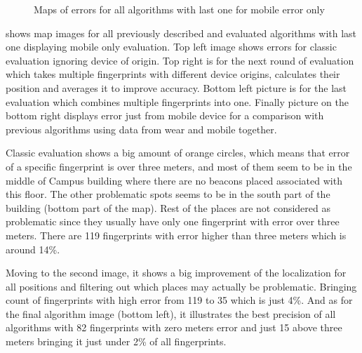 \begin{figure}[h!]
\begin{centering}
		\par\end{centering}
	\caption{Maps of errors for all algorithms with last one for mobile error only}
	\label{fig09c06}
\end{figure}

 shows map images for all previously described and evaluated algorithms with last one displaying mobile only evaluation. Top left image shows errors for classic evaluation ignoring device of origin. Top right is for the next round of evaluation which takes multiple fingerprints with different device origins, calculates their position and averages it to improve accuracy. Bottom left picture is for the last evaluation which combines multiple fingerprints into one. Finally picture on the bottom right displays error just from mobile device for a comparison with previous algorithms using data from wear and mobile together.  

Classic evaluation shows a big amount of orange circles, which means that error of a specific fingerprint is over three meters, and most of them seem to be in the middle of Campus building where there are no beacons placed associated with this floor. The other problematic spots seems to be in the south part of the building (bottom part of the map). Rest of the places are not considered as problematic since they usually have only one fingerprint with error over three meters. There are 119 fingerprints with error higher than three meters which is around 14\%.

Moving to the second image, it shows a big improvement of the localization for all positions and filtering out which places may actually be problematic. Bringing count of fingerprints with high error from 119 to 35 which is just 4\%. And as for the final algorithm image (bottom left), it illustrates the best precision of all algorithms with 82 fingerprints with zero meters error and just 15 above three meters bringing it just under 2\% of all fingerprints.
